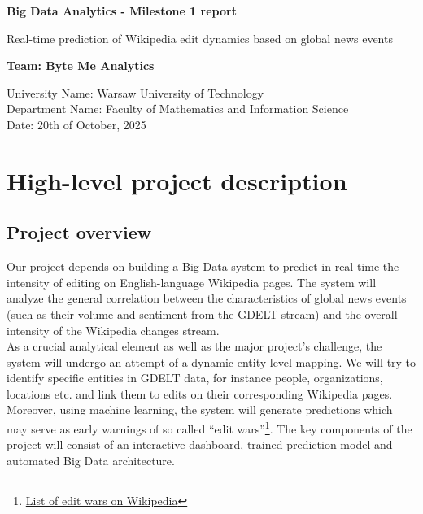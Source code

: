 \documentclass{article}
\begin{document}
\onehalfspacing
\begin{titlepage}
   \begin{center}
       \vspace*{7cm}
    \huge
       \textbf{Big Data Analytics - Milestone 1 report}
       \vspace{0.5 cm}
       \huge
       
       Real-time prediction of Wikipedia edit dynamics based on global news events       
       \vspace{1.5 cm}
    \large
    
       \textbf{Team: Byte Me Analytics}
       \vfill
    \large
       \vspace{0.7 cm}
    
       University Name: Warsaw University of Technology\\
       Department Name: Faculty of Mathematics and Information Science\\ 
       Date: 20th of October, 2025\\
            
   \end{center}
\end{titlepage}


\begin{titlepage}
   \begin{center}
       \vspace*{0.7 cm}
    \tableofcontents        
   \end{center}
\end{titlepage}


\section{High-level project description}
\subsection{Project overview}
Our project depends on building a Big Data system to predict in real-time the intensity of editing on English-language Wikipedia pages. The system will analyze the general correlation between the characteristics of global news events (such as their volume and sentiment from the GDELT stream) and the overall intensity of the Wikipedia changes stream.
\\
As a crucial analytical element as well as the major project's challenge, the system will undergo an attempt of a dynamic entity-level mapping. We will try to identify specific entities in GDELT data, for instance people, organizations, locations etc. and link them to edits on their corresponding Wikipedia pages.
\\
Moreover, using machine learning, the system will generate predictions which may serve as early warnings of so called ``edit wars''\footnote{\href{https://en.wikipedia.org/wiki/List_of_edit_wars_on_Wikipedia}{List of edit wars on Wikipedia}}. The key components of the project will consist of an interactive dashboard, trained prediction model and automated Big Data architecture.  
\end{document}
